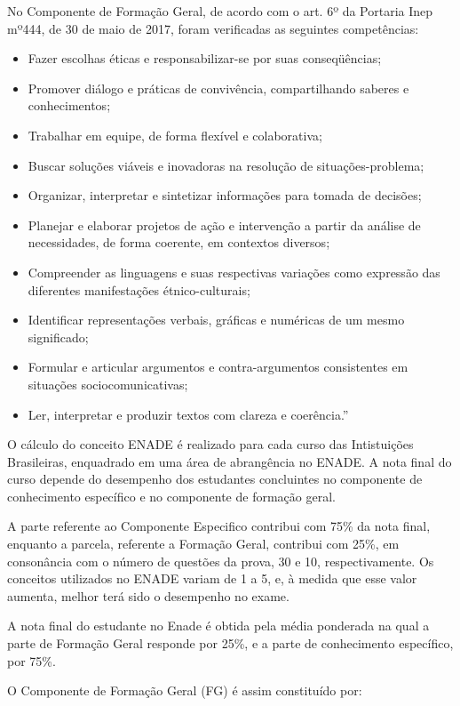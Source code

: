 \documentclass[12pt]{article}
\begin{document}
	  

No Componente de Formação Geral, de acordo com o art. 6º da Portaria Inep mº444, 
de 30 de maio de 2017, foram verificadas as seguintes competências:

\begin{itemize}
\item Fazer escolhas éticas e responsabilizar-se por suas conseqüências; 
\item Promover diálogo e práticas de convivência, compartilhando saberes e conhecimentos; 
\item Trabalhar em equipe, de forma flexível e colaborativa; 
\item Buscar soluções viáveis e inovadoras na resolução de situações-problema;
\item Organizar, interpretar e sintetizar informações para tomada de decisões; 
\item Planejar e elaborar projetos de ação e intervenção a partir da análise de necessidades, de forma coerente, em contextos diversos; 
\item Compreender as linguagens e suas respectivas variações como expressão das diferentes manifestações étnico-culturais;
\item Identificar representações verbais, gráficas e numéricas de um mesmo significado; 
\item Formular e articular argumentos e contra-argumentos consistentes em situações sociocomunicativas;
\item Ler, interpretar e produzir textos com clareza e coerência.”
\end{itemize}

O cálculo do conceito ENADE é realizado para cada curso das Intistuições Brasileiras, enquadrado em uma área de abrangência no ENADE. A nota final do curso depende do desempenho dos estudantes concluintes no componente de conhecimento específico e no componente de formação geral.

A parte referente ao Componente Especifico contribui com 75\% da nota final, enquanto a parcela, referente a Formação Geral, contribui com 25\%, em consonância com o número de questões da prova, 30 e 10, respectivamente. Os conceitos utilizados no ENADE variam de 1 a 5, e, à medida que esse valor aumenta, melhor terá sido o desempenho no exame.

A nota final do estudante no Enade é obtida pela média ponderada na qual a parte de Formação Geral responde por 25\%, e a parte de conhecimento específico, por 75\%.


O Componente de Formação Geral (FG) é assim constituído por: 
\end{document}
